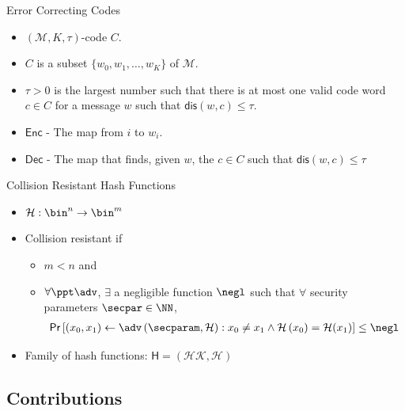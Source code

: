\documentclass{beamer}
\newcommand{\msgspc}{\mathcal{M}}
\begin{document}
\begin{frame}{Error Correcting Codes}
	\begin{itemize}
		\setlength\itemsep{1em}
		\item $(\msgspc, K, \tau)$-code $C$.
		\item $C$ is a subset $\{w_0, w_1, \ldots, w_K \}$ of $\msgspc$.
		\item $\tau > 0$ is the largest number such that there is at most one valid code word $c \in C$ for a message $w$ such that $\mathsf{dis}(w,c) \leq \tau$.
		\item $\mathsf{Enc}$ - The map from $i$ to $w_i$.
		\item $\mathsf{Dec}$ - The map that finds, given $w$, the $c \in C$ such that $\mathsf{dis}(w,c) \leq \tau$\
		
	\end{itemize}
\end{frame}

\begin{frame}{Collision Resistant Hash Functions}
	\begin{itemize}
		\setlength\itemsep{1em}
		\item $\mathcal{H}: \bin^n \rightarrow \bin^m$
		\item Collision resistant if 
		 \begin{itemize}
        \item $m < n$ and
        \item $\forall \ppt \adv$, $\exists$ a negligible function $\negl$ such that $\forall$ security parameters $\secpar \in \NN$,
            \begin{multline*}
            \mathsf{Pr} \left[ ( x_0, x_1) \leftarrow \adv \left( \secparam, \mathcal{H} \right): 
x_0 \neq x_1 \wedge \mathcal{H} \left( x_0 \right) = \mathcal{H}(x_1) \right] \leq \negl
            \end{multline*}
    \end{itemize}
        \item Family of hash functions: $\mathsf{H} = ( \mathcal{HK, H} )$
	\end{itemize}
\end{frame}

\subsection{Contributions}
\end{document}
